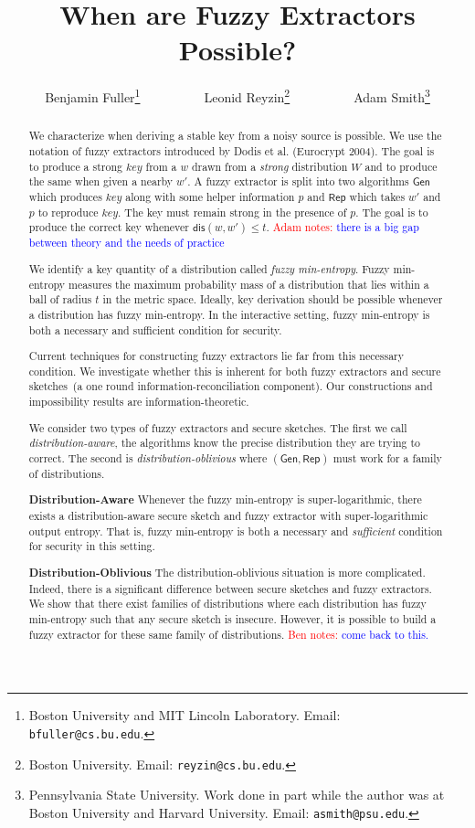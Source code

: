 \documentclass[11pt]{article}
\title{When are Fuzzy Extractors Possible?}
\author{Benjamin Fuller\footnote{Boston University and MIT Lincoln Laboratory. 
Email: {\tt bfuller@cs.bu.edu}.}~~~~~~~~~~Leonid Reyzin\footnote{Boston University.  Email: {\tt reyzin@cs.bu.edu}.}~~~~~~~~~~Adam Smith\footnote{Pennsylvania State University. Work done in part while the author was at Boston University and Harvard University.  Email: {\tt asmith@psu.edu}.  }}
\newcommand{\class}[1]{{\ensuremath{\mathsf{#1}}}}
\newcommand{\gen}{\ensuremath{\class{Gen}}\xspace}
\newcommand{\rep}{\ensuremath{\class{Rep}}\xspace}
\newcommand{\dis}{\ensuremath{\mathsf{dis}}}
\newcommand{\authnote}[2]{{\textcolor{red}{\textsf{#1 notes: }\textcolor{blue}{ #2}}\marginpar{\textcolor{red}{\textbf{!!!!!}}}}}
\newcommand{\authnote}[2]{}
\newcommand{\bnote}[1]{{\authnote{Ben}{#1}}}
\newcommand{\anote}[1]{{\authnote{Adam}{#1}}}
\begin{document}
\maketitle

\begin{abstract}
We characterize when deriving a stable key from a noisy source is possible.  We use the notation of fuzzy extractors introduced by Dodis et al. (Eurocrypt 2004).  The goal is to produce a strong $key$ from a $w$ drawn from a \emph{strong} distribution $W$ and to produce the same when given a nearby $w'$.  A fuzzy extractor is split into two algorithms $\gen$ which produces $key$ along with some helper information $p$ and $\rep$ which takes $w'$ and $p$ to reproduce $key$.  The key must remain strong in the presence of $p$.  The goal is to produce the correct key whenever $\dis(w, w')\le t$.
\anote{there is a big gap between theory and the needs of practice}

We identify a key quantity of a distribution called \emph{fuzzy min-entropy}.  Fuzzy min-entropy measures the maximum probability mass of a distribution that lies within a ball of radius $t$ in the metric space.  Ideally, key derivation should be possible whenever a distribution has fuzzy min-entropy.  In the interactive setting, fuzzy min-entropy is both a necessary and sufficient condition for security.  

Current techniques for constructing fuzzy extractors lie far from this necessary condition.  We investigate whether this is inherent for both fuzzy extractors and secure sketches~(a one round information-reconciliation component).  Our constructions and impossibility results are information-theoretic.  

We consider two types of fuzzy extractors and secure sketches.  The first we call \emph{distribution-aware}, the algorithms know the precise distribution they are trying to correct.  The second is \emph{distribution-oblivious} where $(\gen, \rep)$ must work for a family of distributions.

\textbf{Distribution-Aware} Whenever the fuzzy min-entropy is super-logarithmic, there exists a distribution-aware secure sketch and fuzzy extractor with super-logarithmic output entropy.  That is, fuzzy min-entropy is both a necessary and \emph{sufficient} condition for security in this setting.

\textbf{Distribution-Oblivious} The distribution-oblivious situation is more complicated.  Indeed, there is a significant difference between secure sketches and fuzzy extractors.  We show that there exist families of distributions where each distribution has fuzzy min-entropy such that any secure sketch is insecure.  However, it is possible to build a fuzzy extractor for these same family of distributions.
\bnote{come back to this.}
\end{abstract}
\end{document}
